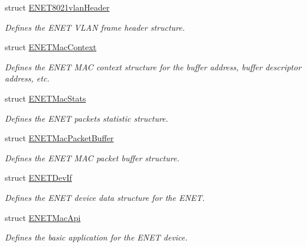 \begin{DoxyCompactItemize}
struct \hyperlink{structENET8021vlanHeader}{E\+N\+E\+T8021vlan\+Header}
\begin{DoxyCompactList}\small\item\em Defines the E\+N\+ET V\+L\+AN frame header structure. \end{DoxyCompactList}\item 
struct \hyperlink{structENETMacContext}{E\+N\+E\+T\+Mac\+Context}
\begin{DoxyCompactList}\small\item\em Defines the E\+N\+ET M\+AC context structure for the buffer address, buffer descriptor address, etc. \end{DoxyCompactList}\item 
struct \hyperlink{structENETMacStats}{E\+N\+E\+T\+Mac\+Stats}
\begin{DoxyCompactList}\small\item\em Defines the E\+N\+ET packets statistic structure. \end{DoxyCompactList}\item 
struct \hyperlink{structENETMacPacketBuffer}{E\+N\+E\+T\+Mac\+Packet\+Buffer}
\begin{DoxyCompactList}\small\item\em Defines the E\+N\+ET M\+AC packet buffer structure. \end{DoxyCompactList}\item 
struct \hyperlink{structENETDevIf}{E\+N\+E\+T\+Dev\+If}
\begin{DoxyCompactList}\small\item\em Defines the E\+N\+ET device data structure for the E\+N\+ET. \end{DoxyCompactList}\item 
struct \hyperlink{structENETMacApi}{E\+N\+E\+T\+Mac\+Api}
\begin{DoxyCompactList}\small\item\em Defines the basic application for the E\+N\+ET device. \end{DoxyCompactList}\end{DoxyCompactItemize}
